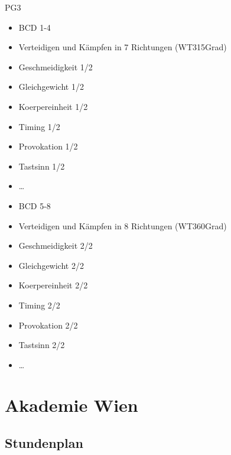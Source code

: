 \begin{WTGradTG}{7}{PG3}

\begin{itemize}
	\item BCD 1-4
	\item Verteidigen und K\"ampfen in 7 Richtungen (WT315Grad)
	\item Geschmeidigkeit 1/2
	\item Gleichgewicht 1/2
	\item Koerpereinheit 1/2
	\item Timing 1/2
	\item Provokation 1/2
	\item Tastsinn 1/2
	\item \ldots
\end{itemize}

\end{WTGradTG}

\begin{WTGradTG}{8}{}

\begin{itemize}
	\item BCD 5-8
	\item Verteidigen und K\"ampfen in 8 Richtungen (WT360Grad)
	\item Geschmeidigkeit 2/2
	\item Gleichgewicht 2/2
	\item Koerpereinheit 2/2
	\item Timing 2/2
	\item Provokation 2/2
	\item Tastsinn 2/2
	\item \ldots
\end{itemize}

\end{WTGradTG}



\section{Akademie Wien}

\subsection{Stundenplan}

